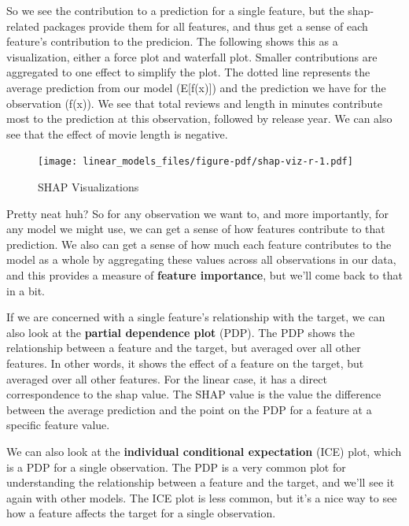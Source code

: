 \documentclass[
  letterpaper,
]{krantz}
\begin{document}
So we see the contribution to a prediction for a single feature, but the
shap-related packages provide them for all features, and thus get a
sense of each feature's contribution to the predicion. The following
shows this as a visualization, either a force plot and waterfall plot.
Smaller contributions are aggregated to one effect to simplify the plot.
The dotted line represents the average prediction from our model
(E{[}f(x){]}) and the prediction we have for the observation (f(x)). We
see that total reviews and length in minutes contribute most to the
prediction at this observation, followed by release year. We can also
see that the effect of movie length is negative.

\begin{figure}

{\centering \texttt{[image: linear\_models\_files/figure-pdf/shap-viz-r-1.pdf]}

}

\caption{SHAP Visualizations}

\end{figure}

Pretty neat huh? So for any observation we want to, and more
importantly, for any model we might use, we can get a sense of how
features contribute to that prediction. We also can get a sense of how
much each feature contributes to the model as a whole by aggregating
these values across all observations in our data, and this provides a
measure of \textbf{feature importance}, but we'll come back to that in a
bit.

If we are concerned with a single feature's relationship with the
target, we can also look at the \textbf{partial dependence plot} (PDP).
The PDP shows the relationship between a feature and the target, but
averaged over all other features. In other words, it shows the effect of
a feature on the target, but averaged over all other features. For the
linear case, it has a direct correspondence to the shap value. The SHAP
value is the value the difference between the average prediction and the
point on the PDP for a feature at a specific feature value.

We can also look at the \textbf{individual conditional expectation}
(ICE) plot, which is a PDP for a single observation. The PDP is a very
common plot for understanding the relationship between a feature and the
target, and we'll see it again with other models. The ICE plot is less
common, but it's a nice way to see how a feature affects the target for
a single observation.
\end{document}
